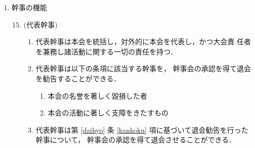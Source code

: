 \begin{enumerate}
\item	幹事の機能\\
%
\begin{enumerate}
\setcounter{enumii}{14}
\item	\label{daihyo}(代表幹事)
\begin{enumerate}
	\item	代表幹事は本会を統括し，対外的に本会を代表し，かつ大会責
任者を兼務し諸活動に関する一切の責任を持つ．\\
	\item	\label{kankoku}代表幹事は以下の条項に該当する幹事を，
幹事会の承認を得て退会を勧告することができる．\\
		\begin{enumerate}
			\item	本会の名誉を著しく毀損した者\\
			\item	本会の活動に著しく支障をきたすもの\\
		\end{enumerate}
	\item	代表幹事は第 \ref{daihyo} 条 \ref{kankoku} 項に基づいて退会勧告を行った幹事について，
幹事会の承認を得て退会させることができる．\\


\end{enumerate}
\end{enumerate}
\end{enumerate}
